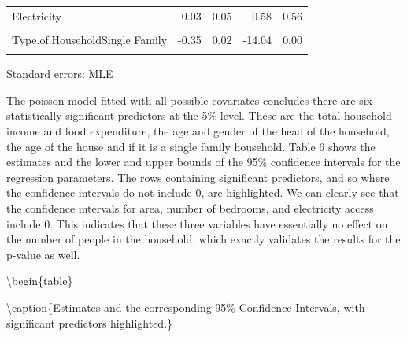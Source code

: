 \documentclass[
]{article}
\begin{document}
\begin{table}[!h]
\begin{threeparttable}
\begin{tabular}{lrrrr}
Electricity & 0.03 & 0.05 & 0.58 & 0.56\\
\cellcolor{gray!6}{Household.Head.SexMale} & \cellcolor{gray!6}{0.22} & \cellcolor{gray!6}{0.03} & \cellcolor{gray!6}{7.41} & \cellcolor{gray!6}{0.00}\\
Type.of.HouseholdSingle Family & -0.35 & 0.02 & -14.04 & 0.00\\
\addlinespace
\cellcolor{gray!6}{Type.of.HouseholdTwo or More Nonrelated Persons/Members} & \cellcolor{gray!6}{-0.14} & \cellcolor{gray!6}{0.16} & \cellcolor{gray!6}{-0.90} & \cellcolor{gray!6}{0.37}\\
\bottomrule
\end{tabular}
\begin{tablenotes}
\item Standard errors: MLE
\end{tablenotes}
\end{threeparttable}
\end{table}

The poisson model fitted with all possible covariates concludes there
are six statistically significant predictors at the 5\% level. These are
the total household income and food expenditure, the age and gender of
the head of the household, the age of the house and if it is a single
family household. Table 6 shows the estimates and the lower and upper
bounds of the 95\% confidence intervals for the regression parameters.
The rows containing significant predictors, and so where the confidence
intervals do not include 0, are highlighted. We can clearly see that the
confidence intervals for area, number of bedrooms, and electricity
access include 0. This indicates that these three variables have
essentially no effect on the number of people in the household, which
exactly validates the results for the p-value as well.

\textbackslash begin\{table\}

\textbackslash caption\{\label{tab:table of estimates and confidence intervals}Estimates
and the corresponding 95\% Confidence Intervals, with significant
predictors highlighted.\} \centering
\end{document}
